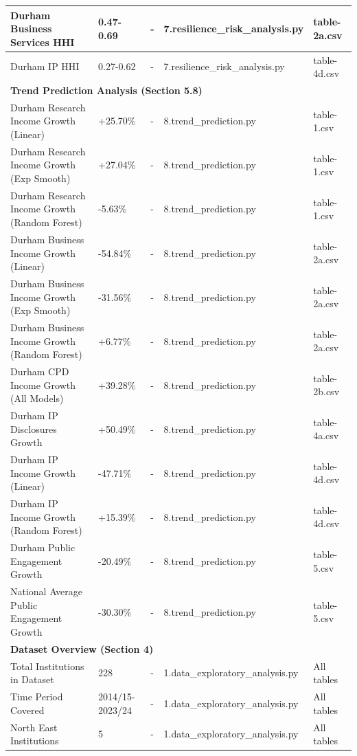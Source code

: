 \documentclass[journal,onecolumn, 10pt,draftclsnofoot]{IEEEtran}
\begin{document}
\begin{table}[h]
{\begin{tabular}{|l|l|l|l|l|}
\hline Durham Business Services HHI & 0.47-0.69 & - & 7.resilience\_risk\_analysis.py & table-2a.csv \\
\hline Durham IP HHI & 0.27-0.62 & - & 7.resilience\_risk\_analysis.py & table-4d.csv \\
\hline \multicolumn{5}{|l|}{\textbf{Trend Prediction Analysis (Section 5.8)}} \\
\hline Durham Research Income Growth (Linear) & +25.70\% & - & 8.trend\_prediction.py & table-1.csv \\
\hline Durham Research Income Growth (Exp Smooth) & +27.04\% & - & 8.trend\_prediction.py & table-1.csv \\
\hline Durham Research Income Growth (Random Forest) & -5.63\% & - & 8.trend\_prediction.py & table-1.csv \\
\hline Durham Business Income Growth (Linear) & -54.84\% & - & 8.trend\_prediction.py & table-2a.csv \\
\hline Durham Business Income Growth (Exp Smooth) & -31.56\% & - & 8.trend\_prediction.py & table-2a.csv \\
\hline Durham Business Income Growth (Random Forest) & +6.77\% & - & 8.trend\_prediction.py & table-2a.csv \\
\hline Durham CPD Income Growth (All Models) & +39.28\% & - & 8.trend\_prediction.py & table-2b.csv \\
\hline Durham IP Disclosures Growth & +50.49\% & - & 8.trend\_prediction.py & table-4a.csv \\
\hline Durham IP Income Growth (Linear) & -47.71\% & - & 8.trend\_prediction.py & table-4d.csv \\
\hline Durham IP Income Growth (Random Forest) & +15.39\% & - & 8.trend\_prediction.py & table-4d.csv \\
\hline Durham Public Engagement Growth & -20.49\% & - & 8.trend\_prediction.py & table-5.csv \\
\hline National Average Public Engagement Growth & -30.30\% & - & 8.trend\_prediction.py & table-5.csv \\
\hline \multicolumn{5}{|l|}{\textbf{Dataset Overview (Section 4)}} \\
\hline Total Institutions in Dataset & 228 & - & 1.data\_exploratory\_analysis.py & All tables \\
\hline Time Period Covered & 2014/15-2023/24 & - & 1.data\_exploratory\_analysis.py & All tables \\
\hline North East Institutions & 5 & - & 1.data\_exploratory\_analysis.py & All tables \\

\end{tabular}}
\end{table}
\end{document}
